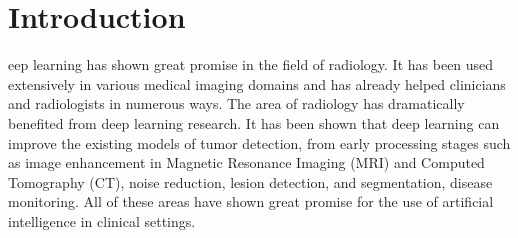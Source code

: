 \section{Introduction}

eep learning has shown great promise in the field of radiology. It has been used extensively in various medical imaging domains and has already helped clinicians and radiologists in numerous ways. The area of radiology has dramatically benefited from deep learning research. It has been shown that deep learning can improve the existing models of tumor detection, from early processing stages such as image enhancement in Magnetic Resonance Imaging (MRI) and Computed Tomography (CT), noise reduction, lesion detection, and segmentation, disease monitoring. All of these areas have shown great promise for the use of artificial intelligence in clinical settings. 

